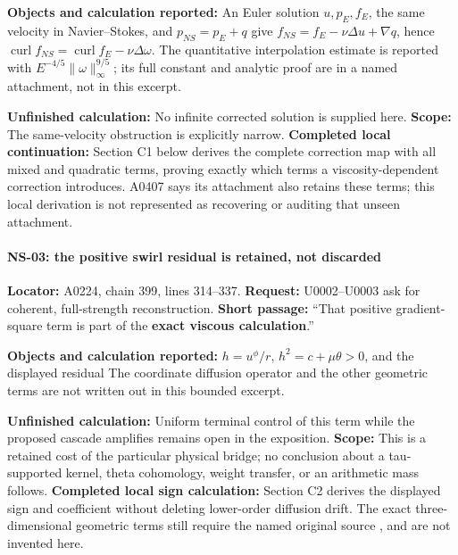 \textbf{Objects and calculation reported:} An Euler solution
\(u,p_E,f_E\), the same velocity in Navier--Stokes, and \(p_{NS}=p_E+q\)
give \(f_{NS}=f_E-\nu\Delta u+\nabla q\), hence
\(\operatorname{curl}f_{NS}=\operatorname{curl}f_E-\nu\Delta\omega\).
The quantitative interpolation estimate is reported with
\(E^{-4/5}\|\omega\|_\infty^{9/5}\); its full constant and analytic
proof are in a named attachment, not in this excerpt.

\textbf{Unfinished calculation:} No infinite corrected solution is
supplied here. \textbf{Scope:} The same-velocity obstruction is
explicitly narrow. \textbf{Completed local continuation:} Section C1
below derives the complete correction map with all mixed and quadratic
terms, proving exactly which terms a viscosity-dependent correction
introduces. A0407 says its attachment also retains these terms; this
local derivation is not represented as recovering or auditing that
unseen attachment.

\paragraph{NS-03: the positive swirl residual is retained, not
discarded}\label{TranscriptLedgerStage:ns-03-the-positive-swirl-residual-is-retained-not-discarded}

\textbf{Locator:} A0224, chain 399, lines 314--337. \textbf{Request:}
U0002--U0003 ask for coherent, full-strength reconstruction.
\textbf{Short passage:} ``That positive gradient-square term is part of
the \textbf{exact viscous calculation}.''

\textbf{Objects and calculation reported:} \(h=u^\phi/r\),
\(h^2=c+\mu\theta>0\), and the displayed residual  The coordinate diffusion operator and the other geometric terms are
not written out in this bounded excerpt.

\textbf{Unfinished calculation:} Uniform terminal control of this term
while the proposed cascade amplifies remains open in the exposition.
\textbf{Scope:} This is a retained cost of the particular physical
bridge; no conclusion about a tau-supported kernel, theta cohomology,
weight transfer, or an arithmetic mass follows. \textbf{Completed local
sign calculation:} Section C2 derives the displayed sign and coefficient
without deleting lower-order diffusion drift. The exact
three-dimensional geometric terms still require the named original
source \protect{}, and are not invented
here.

